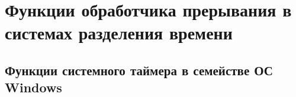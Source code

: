 \chapter{Функции обработчика прерывания в системах разделения времени}

\section{Функции системного таймера в семействе ОС Windows}
